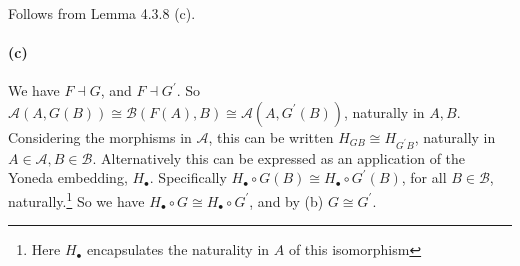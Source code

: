 \documentclass{article}
\begin{document}
Follows from Lemma 4.3.8 (c).

\paragraph{(c)}

We have $F \dashv G$, and $F \dashv G^\prime$. So $\mathcal{A}(A, G(B)) \cong \mathcal{B}(F(A),B) \cong \mathcal{A}(A,G^\prime(B))$, naturally in $A, B$.  Considering  the morphisms in $\mathcal{A}$, this can be written $H_{GB} \cong H_{G^\prime B}$, naturally in $A \in \mathcal{A}, B \in \mathcal{B}$. Alternatively this can be expressed as an application of the Yoneda embedding, $H_\bullet$. Specifically $H_{\bullet}\circ G(B) \cong H_{\bullet} \circ G^\prime(B)$, for all $B \in \mathcal{B}$, naturally.\footnote{Here $H_\bullet$ encapsulates the naturality in $A$ of this isomorphism} So we have $H_{\bullet} \circ G \cong H_{\bullet} \circ G^\prime$, and by (b) $G \cong G^\prime$.
\end{document}
